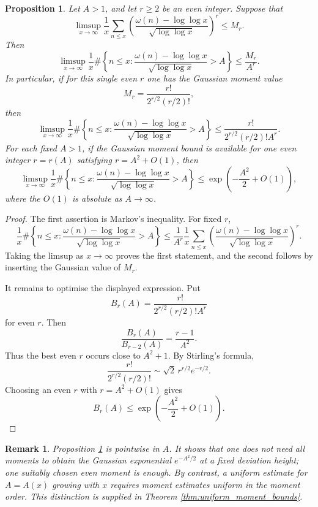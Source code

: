 \documentclass[12pt,a4paper,reqno]{amsart}
\theoremstyle{plain}
\newtheorem{prpstn}[thrm]{Proposition}
\newtheorem*{rmk}{Remark}
\numberwithin{sblmm}{thrm}
\numberwithin{equation}{section}
\begin{document}
\begin{prpstn}\label{prop:fixed_high_moment}
    Let $A>1$, and let $r\ge 2$ be an even integer. Suppose that
    $$\limsup_{x\to\infty}\frac{1}{x}\sum_{n\le x}\left(\frac{\omega(n)-\log\log x}{\sqrt{\log\log x}}\right)^r\le M_r.$$
    Then
    $$\limsup_{x\to\infty}\frac{1}{x}\#\left\{n\le x:\frac{\omega(n)-\log\log x}{\sqrt{\log\log x}}>A\right\}\le\frac{M_r}{A^r}.$$
    In particular, if for this single even $r$ one has the Gaussian moment value
    $$M_r=\frac{r!}{2^{r/2}(r/2)!},$$
    then
    $$\limsup_{x\to\infty}\frac{1}{x}\#\left\{n\le x:\frac{\omega(n)-\log\log x}{\sqrt{\log\log x}}>A\right\}\le\frac{r!}{2^{r/2}(r/2)!A^r}.$$
    For each fixed $A>1$, if the Gaussian moment bound is available for one even integer $r=r(A)$ satisfying $r=A^2+O(1)$, then
    $$\limsup_{x\to\infty}\frac{1}{x}\#\left\{n\le x:\frac{\omega(n)-\log\log x}{\sqrt{\log\log x}}>A\right\}\le\exp\left(-\frac{A^2}{2}+O(1)\right),$$
    where the $O(1)$ is absolute as $A\to\infty$.
\end{prpstn}
\begin{proof}
    The first assertion is Markov's inequality. For fixed $r$,
    $$\frac{1}{x}\#\left\{n\le x:\frac{\omega(n)-\log\log x}{\sqrt{\log\log x}}>A\right\}\le\frac{1}{A^r}\frac{1}{x}\sum_{n\le x}\left(\frac{\omega(n)-\log\log x}{\sqrt{\log\log x}}\right)^r.$$
    Taking the limsup as $x\to\infty$ proves the first statement, and the second follows by inserting the Gaussian value of $M_r$.

    It remains to optimise the displayed expression. Put
    $$B_r(A)=\frac{r!}{2^{r/2}(r/2)!A^r}$$
    for even $r$. Then
    $$\frac{B_r(A)}{B_{r-2}(A)}=\frac{r-1}{A^2}.$$
    Thus the best even $r$ occurs close to $A^2+1$. By Stirling's formula,
    $$\frac{r!}{2^{r/2}(r/2)!}\sim \sqrt{2}\,r^{r/2}e^{-r/2}.$$
    Choosing an even $r$ with $r=A^2+O(1)$ gives
    $$B_r(A)\le\exp\left(-\frac{A^2}{2}+O(1)\right).$$
\end{proof}

\begin{rmk}
    Proposition \ref{prop:fixed_high_moment} is pointwise in $A$. It shows that one does not need all moments to obtain the Gaussian exponential $e^{-A^2/2}$ at a fixed deviation height; one suitably chosen even moment is enough. By contrast, a uniform estimate for $A=A(x)$ growing with $x$ requires moment estimates uniform in the moment order. This distinction is supplied in Theorem \ref{thm:uniform_moment_bounds}.
\end{rmk}
\end{document}
